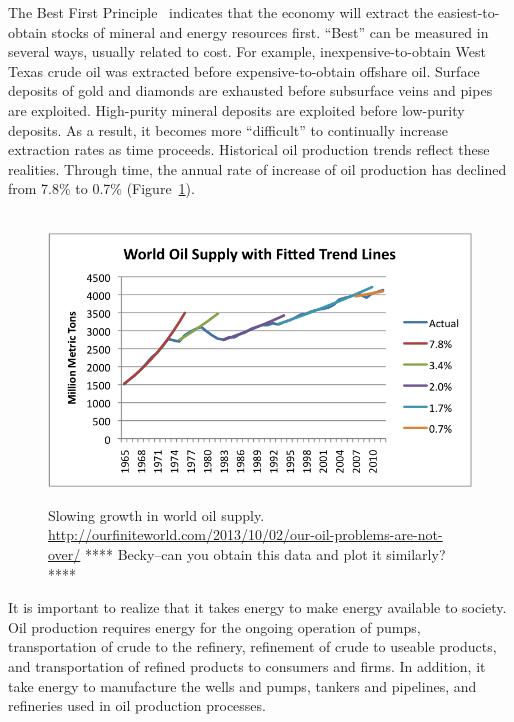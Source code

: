 The Best First Principle~\cite{Cleveland:2008aa}
indicates that the economy will extract the easiest-to-obtain 
stocks of mineral and energy resources first.
``Best'' can be measured in several ways, usually related to cost.
For example, inexpensive-to-obtain West Texas crude oil was extracted
before expensive-to-obtain offshare oil. 
Surface deposits of gold and diamonds are exhausted before subsurface
veins and pipes are exploited.
High-purity mineral deposits are exploited before low-purity deposits.
As a result, it becomes more ``difficult'' to continually increase
extraction rates as time proceeds.
Historical oil production trends reflect these realities.
Through time, the annual rate of increase of oil production
has declined from 7.8\% to 0.7\% (Figure~\ref{fig:oil_production}).

\begin{figure}[!ht]
\centering\
\includegraphics[width=\linewidth]{Part_0/Chapter_Introduction/images/growth-in-world-oil-supply.png}
\caption[World Oil Supply]{Slowing growth in world oil supply.
\url{http://ourfiniteworld.com/2013/10/02/our-oil-problems-are-not-over/}
**** Becky--can you obtain this data and plot it similarly? ****
}
\label{fig:oil_production}
\end{figure}

It is important to realize that it takes energy to make energy available to society.
Oil production requires energy for the ongoing
operation of pumps, 
transportation of crude to the refinery,
refinement of crude to useable products, and 
transportation of refined products to consumers and firms.
In addition, it take energy to manufacture the wells and pumps, 
tankers and pipelines, and
refineries used in oil production processes.

